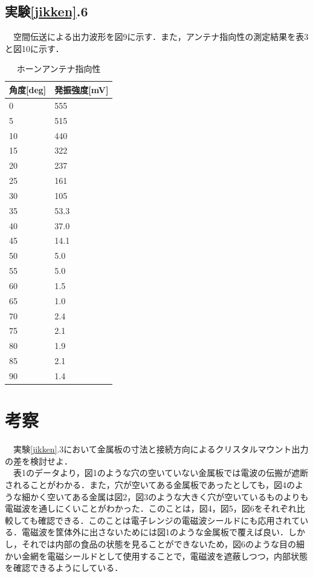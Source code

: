  \subsection{実験\ref{jikken}.6}
  　空間伝送による出力波形を図9に示す．また，アンテナ指向性の測定結果を表3と図10に示す．
  \begin{table}[H]
    \centering
    \caption{ホーンアンテナ指向性}
    \begin{tabular}{|l|l|}
    \hline
    角度{[}deg{]} & 発振強度{[}mV{]} \\ \hline
    0           & 555          \\ \hline
    5           & 515          \\ \hline
    10          & 440          \\ \hline
    15          & 322          \\ \hline
    20          & 237          \\ \hline
    25          & 161          \\ \hline
    30          & 105          \\ \hline
    35          & 53.3         \\ \hline
    40          & 37.0         \\ \hline
    45          & 14.1         \\ \hline
    50          & 5.0          \\ \hline
    55          & 5.0          \\ \hline
    60          & 1.5          \\ \hline
    65          & 1.0          \\ \hline
    70          & 2.4          \\ \hline
    75          & 2.1          \\ \hline
    80          & 1.9          \\ \hline
    85          & 2.1          \\ \hline
    90          & 1.4          \\ \hline
    \end{tabular}
  \end{table}

\newpage
\section{考察}
　実験\ref{jikken}.3において金属板の寸法と接続方向によるクリスタルマウント出力の差を検討せよ．\\
　表1のデータより，図1のような穴の空いていない金属板では電波の伝搬が遮断されることがわかる．また，穴が空いてある金属板であったとしても，図4のような細かく空いてある金属は図2，図3のような大きく穴が空いているものよりも電磁波を通しにくいことがわかった．このことは，図4，図5，図6をそれぞれ比較しても確認できる．このことは電子レンジの電磁波シールドにも応用されている．電磁波を筐体外に出さないためには図1のような金属板で覆えば良い．しかし，それでは内部の食品の状態を見ることができないため，図6のような目の細かい金網を電磁シールドとして使用することで，電磁波を遮蔽しつつ，内部状態を確認できるようにしている．\\


